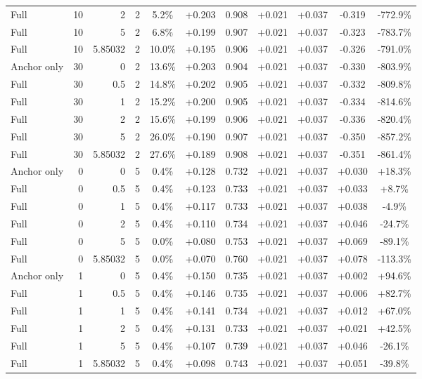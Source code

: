 \begin{table}[htbp]
\begin{tabular}{lrrrccccccc}
Full & 10 & 2 & 2 & 5.2\% & +0.203 & 0.908 & +0.021 & +0.037 & -0.319 & -772.9\% \\
Full & 10 & 5 & 2 & 6.8\% & +0.199 & 0.907 & +0.021 & +0.037 & -0.323 & -783.7\% \\
Full & 10 & 5.85032 & 2 & 10.0\% & +0.195 & 0.906 & +0.021 & +0.037 & -0.326 & -791.0\% \\
Anchor only & 30 & 0 & 2 & 13.6\% & +0.203 & 0.904 & +0.021 & +0.037 & -0.330 & -803.9\% \\
Full & 30 & 0.5 & 2 & 14.8\% & +0.202 & 0.905 & +0.021 & +0.037 & -0.332 & -809.8\% \\
Full & 30 & 1 & 2 & 15.2\% & +0.200 & 0.905 & +0.021 & +0.037 & -0.334 & -814.6\% \\
Full & 30 & 2 & 2 & 15.6\% & +0.199 & 0.906 & +0.021 & +0.037 & -0.336 & -820.4\% \\
Full & 30 & 5 & 2 & 26.0\% & +0.190 & 0.907 & +0.021 & +0.037 & -0.350 & -857.2\% \\
Full & 30 & 5.85032 & 2 & 27.6\% & +0.189 & 0.908 & +0.021 & +0.037 & -0.351 & -861.4\% \\
Anchor only & 0 & 0 & 5 & 0.4\% & +0.128 & 0.732 & +0.021 & +0.037 & +0.030 & +18.3\% \\
Full & 0 & 0.5 & 5 & 0.4\% & +0.123 & 0.733 & +0.021 & +0.037 & +0.033 & +8.7\% \\
Full & 0 & 1 & 5 & 0.4\% & +0.117 & 0.733 & +0.021 & +0.037 & +0.038 & -4.9\% \\
Full & 0 & 2 & 5 & 0.4\% & +0.110 & 0.734 & +0.021 & +0.037 & +0.046 & -24.7\% \\
Full & 0 & 5 & 5 & 0.0\% & +0.080 & 0.753 & +0.021 & +0.037 & +0.069 & -89.1\% \\
Full & 0 & 5.85032 & 5 & 0.0\% & +0.070 & 0.760 & +0.021 & +0.037 & +0.078 & -113.3\% \\
Anchor only & 1 & 0 & 5 & 0.4\% & +0.150 & 0.735 & +0.021 & +0.037 & +0.002 & +94.6\% \\
Full & 1 & 0.5 & 5 & 0.4\% & +0.146 & 0.735 & +0.021 & +0.037 & +0.006 & +82.7\% \\
Full & 1 & 1 & 5 & 0.4\% & +0.141 & 0.734 & +0.021 & +0.037 & +0.012 & +67.0\% \\
Full & 1 & 2 & 5 & 0.4\% & +0.131 & 0.733 & +0.021 & +0.037 & +0.021 & +42.5\% \\
Full & 1 & 5 & 5 & 0.4\% & +0.107 & 0.739 & +0.021 & +0.037 & +0.046 & -26.1\% \\
Full & 1 & 5.85032 & 5 & 0.4\% & +0.098 & 0.743 & +0.021 & +0.037 & +0.051 & -39.8\% \\

\end{tabular}
\end{table}
